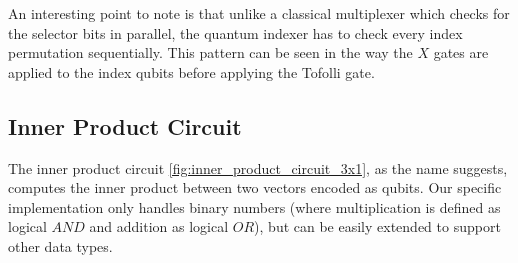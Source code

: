 \documentclass[10pt]{proc}
\theoremstyle{definition}
\theoremstyle{remark}
\begin{document}
An interesting point to note is that unlike a classical multiplexer which
checks for the selector bits in parallel, the quantum indexer has to check
every index permutation sequentially. This pattern can be seen in the way
the $X$ gates are applied to the index qubits before applying the Tofolli
gate.

\subsection{Inner Product Circuit}

The inner product circuit \ref{fig:inner_product_circuit_3x1}, as the name
suggests, computes the inner product between two vectors encoded as qubits. Our
specific implementation only handles binary numbers (where multiplication is
defined as logical $AND$ and addition as logical $OR$), but can be easily
extended to support other data types.
\end{document}
